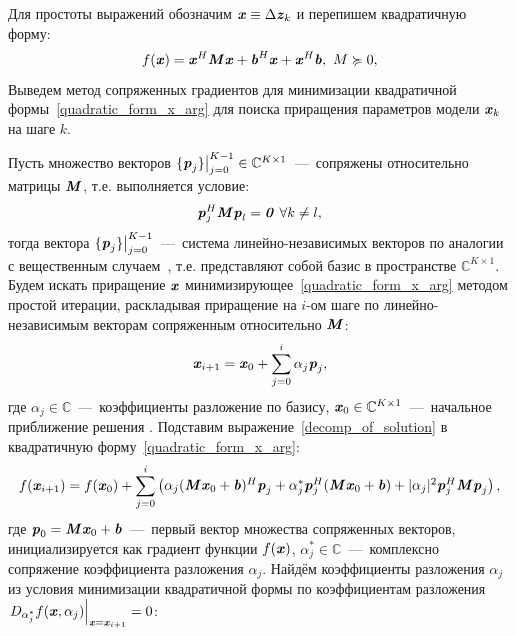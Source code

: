 Для простоты выражений обозначим $\textbf{\textit{x}}\equiv\Delta\textbf{\textit{z}}_k$ и перепишем квадратичную форму:
\begin{equation}
	f(\textbf{\textit{x}})=\textbf{\textit{x}}^H\textbf{\textit{M}}\textbf{\textit{x}}+
	\textbf{\textit{b}}^H\textbf{\textit{x}}+\textbf{\textit{x}}^H\textbf{\textit{b}}, \text{  }M\succcurlyeq 0,
	\label{quadratic_form_x_arg}
\end{equation}
Выведем метод сопряженных градиентов для минимизации квадратичной формы~\eqref{quadratic_form_x_arg} для поиска приращения параметров модели $\textbf{\textit{x}}_k$ на шаге $k$.

Пусть множество векторов $\{\textbf{\textit{p}}_j\}\big|_{j=0}^{K-1}\in\mathbb{C}^{K\times1}$~---~сопряжены относительно матрицы $\textbf{\textit{M}}$, т.е. выполняется условие:
\begin{equation}
	\textbf{\textit{p}}_j^H\textbf{\textit{M}}\textbf{\textit{p}}_l=\textbf{\textit{0}}\text{    }\forall k \neq l,
	\label{conj_cond}
\end{equation}
тогда вектора $\{\textbf{\textit{p}}_j\}\big|_{j=0}^{K-1}$~---~система линейно-независимых векторов по аналогии с вещественным случаем~\cite{HestenesStiefel1952}, т.е. представляют собой базис в пространстве $\mathbb{C}^{K\times1}$. Будем искать приращение $\textbf{\textit{x}}$ минимизирующее~\eqref{quadratic_form_x_arg} методом простой итерации, раскладывая приращение на $i$-ом шаге по линейно-независимым векторам сопряженным относительно $\textbf{\textit{M}}$:
\begin{equation}
	\textbf{\textit{x}}_{i+1}=\textbf{\textit{x}}_0+\sum_{j=0}^{i}\alpha_j\textbf{\textit{p}}_j,
	\label{decomp_of_solution}
\end{equation}
где $\alpha_j\in\mathbb{C}$~---~коэффициенты разложение по базису, $\textbf{\textit{x}}_0\in\mathbb{C}^{K\times1}$~---~начальное приближение решения . Подставим выражение~\eqref{decomp_of_solution} в квадратичную форму~\eqref{quadratic_form_x_arg}:
\begin{equation}
	f(\textbf{\textit{x}}_{i+1})=f(\textbf{\textit{x}}_0)+\sum_{j=0}^{i}
	\begin{pmatrix}
		\alpha_j(\textbf{\textit{M}}\textbf{\textit{x}}_0+\textbf{\textit{b}})^H\textbf{\textit{p}}_j+
		\alpha_j^*\textbf{\textit{p}}_j^H(\textbf{\textit{M}}\textbf{\textit{x}}_0+\textbf{\textit{b}})+
		|\alpha_j|^2\textbf{\textit{p}}_j^H\textbf{\textit{M}}\textbf{\textit{p}}_j
	\end{pmatrix},
	\label{big_bad_expression}
\end{equation}
где $\textbf{\textit{p}}_0=\textbf{\textit{M}}\textbf{\textit{x}}_0+\textbf{\textit{b}}$~---~первый вектор множества сопряженных векторов, инициализируется как градиент функции $f(\textbf{\textit{x}})$, $\alpha_j^*\in\mathbb{C}$~---~комплексно сопряжение коэффициента разложения $\alpha_j$. Найдём коэффициенты разложения $\alpha_j$ из условия минимизации квадратичной формы по коэффициентам разложения $\left. D_{\alpha_j^*}f(\textbf{\textit{x}}, \alpha_j) \right|_{\textbf{\textit{x}}=\textbf{\textit{x}}_{i+1}}=0$:
